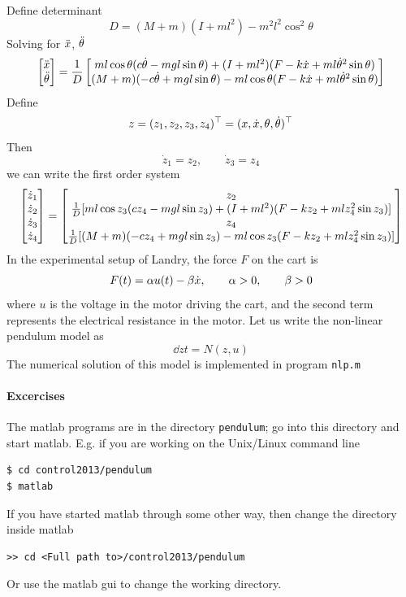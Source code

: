\documentclass[12pt]{article}
\begin{document}
Define determinant
\[
D = (M+m)(I+ml^2) - m^2 l^2 \cos^2\theta
\]
Solving for $\ddot{x}$, $\ddot{\theta}$
\[
\begin{bmatrix}
\ddot{x} \\ \ddot{\theta} \end{bmatrix} = \frac{1}{D} \begin{bmatrix}
m l \cos\theta (c \dot{\theta} - mgl\sin\theta) + (I+ml^2)(F - k\dot{x} + ml\dot{\theta}^2 \sin\theta) \\
(M+m)(-c\dot{\theta} + mgl\sin\theta) - ml\cos\theta(F - k\dot{x} + ml\dot{\theta}^2 \sin\theta)
\end{bmatrix}
\]
Define
\[
z = (z_1, z_2, z_3, z_4)^\top = (x, \dot{x}, \theta, \dot{\theta})^\top
\]
Then
\[
\dot{z}_1 = z_2, \qquad \dot{z}_3 = z_4
\]
we can write the first order system
\[
\begin{bmatrix}
\dot{z}_1 \\ \dot{z}_2 \\ \dot{z}_3 \\ \dot{z}_4 \end{bmatrix} = \begin{bmatrix}
z_2 \\
\frac{1}{D} [ m l \cos z_3 (c z_4 - mgl\sin z_3) + (I+ml^2)(F - k z_2 + ml z_4^2 \sin      z_3)] \\
z_4 \\
\frac{1}{D}[ (M+m)(-c z_4 + mgl\sin z_3) - ml\cos z_3 (F - k z_2 + ml z_4^2 \sin z_3)]
\end{bmatrix}
\]
In the experimental setup of Landry, the force $F$ on the cart is
\[
F(t) = \alpha u(t) - \beta \dot{x}, \qquad \alpha > 0, \qquad \beta > 0
\]
where $u$ is the voltage in the motor driving the cart, and the second term represents the electrical resistance in the motor. Let us write the non-linear pendulum model as
\[
\dd{z}{t} = N(z,u)
\]
The numerical solution of this model is implemented in program {\tt nlp.m}
\paragraph{Excercises}
The matlab programs are in the directory {\tt pendulum}; go into this directory and start matlab. E.g. if you are working on the Unix/Linux command line
\begin{lstlisting}
$ cd control2013/pendulum
$ matlab
\end{lstlisting}
If you have started matlab through some other way, then change the directory inside matlab
\begin{lstlisting}
>> cd <Full path to>/control2013/pendulum
\end{lstlisting}
Or use the matlab gui to change the working directory.
\end{document}
